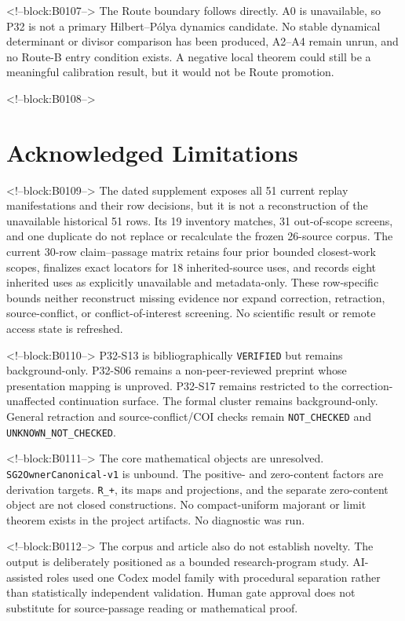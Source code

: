 \documentclass[11pt]{article}
\begin{document}
<!--block:B0107-->
The Route boundary follows directly. A0 is unavailable, so P32 is not a
primary Hilbert--Pólya dynamics candidate. No stable dynamical
determinant or divisor comparison has been produced, A2--A4 remain
unrun, and no Route-B entry condition exists. A negative local theorem
could still be a meaningful calibration result, but it would not be
Route promotion.

<!--block:B0108-->
\hypertarget{8-acknowledged-limitations}{%
\section{Acknowledged
Limitations}\label{8-acknowledged-limitations}}

<!--block:B0109-->
The dated supplement exposes all 51 current replay
manifestations and their row decisions, but it is not a reconstruction of the
unavailable historical 51 rows. Its 19 inventory matches, 31 out-of-scope screens,
and one duplicate do not replace or recalculate the frozen 26-source corpus. The
current 30-row claim--passage matrix retains four prior bounded closest-work scopes,
finalizes exact locators for 18 inherited-source uses, and records eight inherited
uses as explicitly unavailable and metadata-only. These row-specific bounds neither
reconstruct missing evidence nor expand correction, retraction, source-conflict, or
conflict-of-interest screening. No scientific result or remote access state is
refreshed.

<!--block:B0110-->
P32-S13 is bibliographically \texttt{VERIFIED} but remains background-only. P32-S06 remains
a non-peer-reviewed preprint whose presentation mapping is unproved.
P32-S17 remains restricted to the correction-unaffected continuation
surface. The formal cluster remains background-only. General retraction
and source-conflict/COI checks remain \texttt{NOT\_CHECKED} and
\texttt{UNKNOWN\_NOT\_CHECKED}.

<!--block:B0111-->
The core mathematical objects are unresolved.
\texttt{SG2OwnerCanonical-v1} is unbound. The positive- and zero-content
factors are derivation targets. \texttt{R\_+}, its maps and projections,
and the separate zero-content object are not closed constructions. No
compact-uniform majorant or limit theorem exists in the project
artifacts. No diagnostic was run.

<!--block:B0112-->
The corpus and article also do not establish novelty. The output is
deliberately positioned as a bounded research-program study.
AI-assisted roles used one Codex model family with procedural separation
rather than statistically independent validation. Human gate approval
does not substitute for source-passage reading or mathematical proof.
\end{document}
